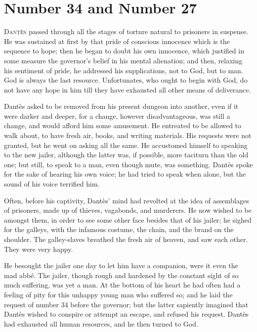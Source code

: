 \chapter{Number 34 and Number 27} 

 \lettrine{D}{antès} passed through all the stages of torture natural to prisoners in suspense. He was sustained at first by that pride of conscious innocence which is the sequence to hope; then he began to doubt his own innocence, which justified in some measure the governor's belief in his mental alienation; and then, relaxing his sentiment of pride, he addressed his supplications, not to God, but to man. God is always the last resource. Unfortunates, who ought to begin with God, do not have any hope in him till they have exhausted all other means of deliverance. 

 Dantès asked to be removed from his present dungeon into another, even if it were darker and deeper, for a change, however disadvantageous, was still a change, and would afford him some amusement. He entreated to be allowed to walk about, to have fresh air, books, and writing materials. His requests were not granted, but he went on asking all the same. He accustomed himself to speaking to the new jailer, although the latter was, if possible, more taciturn than the old one; but still, to speak to a man, even though mute, was something. Dantès spoke for the sake of hearing his own voice; he had tried to speak when alone, but the sound of his voice terrified him. 

 Often, before his captivity, Dantès' mind had revolted at the idea of assemblages of prisoners, made up of thieves, vagabonds, and murderers. He now wished to be amongst them, in order to see some other face besides that of his jailer; he sighed for the galleys, with the infamous costume, the chain, and the brand on the shoulder. The galley-slaves breathed the fresh air of heaven, and saw each other. They were very happy. 

 He besought the jailer one day to let him have a companion, were it even the mad abbé. The jailer, though rough and hardened by the constant sight of so much suffering, was yet a man. At the bottom of his heart he had often had a feeling of pity for this unhappy young man who suffered so; and he laid the request of number 34 before the governor; but the latter sapiently imagined that Dantès wished to conspire or attempt an escape, and refused his request. Dantès had exhausted all human resources, and he then turned to God. 

